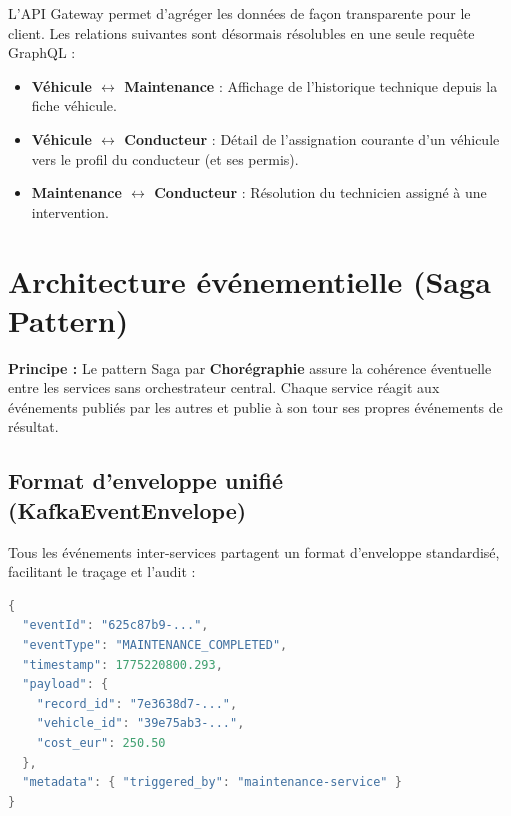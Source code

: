 \documentclass[12pt,a4paper]{article}
\begin{document}
L'API Gateway permet d'agréger les données de façon transparente pour le client. Les relations suivantes sont désormais résolubles en une seule requête GraphQL :

\begin{itemize}
    \item \textbf{Véhicule $\leftrightarrow$ Maintenance} : Affichage de l'historique technique depuis la fiche véhicule.
    \item \textbf{Véhicule $\leftrightarrow$ Conducteur} : Détail de l'assignation courante d'un véhicule vers le profil du conducteur (et ses permis).
    \item \textbf{Maintenance $\leftrightarrow$ Conducteur} : Résolution du technicien assigné à une intervention.
\end{itemize}

\newpage

\section{Architecture événementielle (Saga Pattern)}

\begin{infobox}
\textbf{Principe :} Le pattern Saga par \textbf{Chorégraphie} assure la cohérence éventuelle entre les services sans orchestrateur central. Chaque service réagit aux événements publiés par les autres et publie à son tour ses propres événements de résultat.
\end{infobox}

\subsection{Format d'enveloppe unifié (KafkaEventEnvelope)}

Tous les événements inter-services partagent un format d'enveloppe standardisé, facilitant le traçage et l'audit :

\begin{lstlisting}[language=java, caption=Format KafkaEventEnvelope unifié]
{
  "eventId": "625c87b9-...",
  "eventType": "MAINTENANCE_COMPLETED",
  "timestamp": 1775220800.293,
  "payload": {
    "record_id": "7e3638d7-...",
    "vehicle_id": "39e75ab3-...",
    "cost_eur": 250.50
  },
  "metadata": { "triggered_by": "maintenance-service" }
}
\end{lstlisting}
\end{document}
